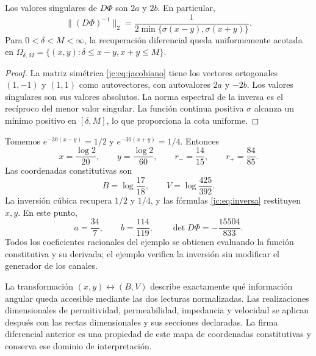 \begin{proposition}
Los valores singulares de $D\Phi$ son $2a$ y $2b$. En particular,
\[
\bigl\|(D\Phi)^{-1}\bigr\|_2
=\frac1{2\min\{\sigma(x-y),\sigma(x+y)\}}.
\]
Para $0<\delta<M<\infty$, la recuperación diferencial queda
uniformemente acotada en
$\Omega_{\delta,M}=\{(x,y):\delta\le x-y,x+y\le M\}$.
\end{proposition}
\begin{proof}
La matriz simétrica \eqref{jc:eq:jacobiano} tiene los vectores
ortogonales $(1,-1)$ y $(1,1)$ como autovectores, con autovalores
$2a$ y $-2b$. Los valores singulares son sus valores absolutos.
La norma espectral de la inversa es el recíproco del menor valor
singular. La función continua positiva $\sigma$ alcanza un mínimo
positivo en $[\delta,M]$, lo que proporciona la cota uniforme.
\end{proof}

\begin{example}
Tomemos $e^{-30(x-y)}=1/2$ y $e^{-30(x+y)}=1/4$. Entonces
\[
x=\frac{\log2}{20},\qquad y=\frac{\log2}{60},\qquad
r_-=\frac{14}{15},\qquad r_+=\frac{84}{85}.
\]
Las coordenadas constitutivas son
\[
B=\log\frac{17}{18},\qquad V=\log\frac{425}{392}.
\]
La inversión cúbica recupera $1/2$ y $1/4$, y las fórmulas
\eqref{jc:eq:inversa} restituyen $x,y$. En este punto,
\[
a=\frac{34}{7},\qquad b=\frac{114}{119},\qquad
\det D\Phi=-\frac{15504}{833}.
\]
Todos los coeficientes racionales del ejemplo se obtienen evaluando
la función constitutiva y su derivada; el ejemplo verifica la
inversión sin modificar el generador de los canales.
\end{example}

La transformación $(x,y)\leftrightarrow(B,V)$ describe exactamente
qué información angular queda accesible mediante las dos lecturas
normalizadas. Las realizaciones dimensionales de permitividad,
permeabilidad, impedancia y velocidad se aplican después con las rectas
dimensionales y sus secciones declaradas. La firma diferencial anterior
es una propiedad de este mapa de coordenadas constitutivas y conserva
ese dominio de interpretación.
